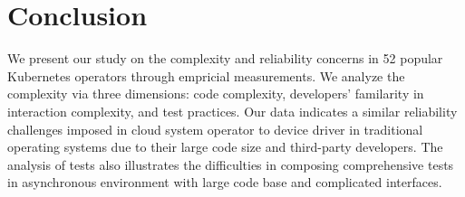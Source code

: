 \section{Conclusion}

We present our study on the complexity and reliability concerns in 52 popular Kubernetes operators through empricial measurements.
We analyze the complexity via three dimensions: code complexity, developers' familarity in interaction complexity, 
    and test practices.
Our data indicates a similar reliability challenges imposed in cloud system operator to device driver in 
    traditional operating systems due to their large code size and third-party developers. 
The analysis of tests also illustrates the difficulties in composing comprehensive tests in 
    asynchronous environment with large code base and complicated interfaces. 
